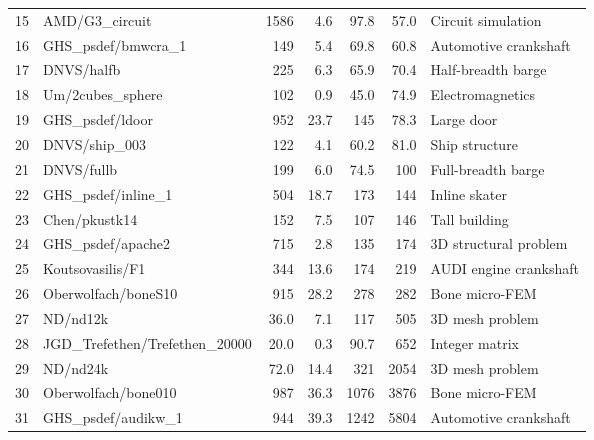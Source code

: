 \documentclass{article}
\begin{document}
\begin{table}[htbp]
\begin{center}
{\begin{tabular}{rl|rrrrl}
      15 & AMD/G3\_circuit                 & 1586     & 4.6      & 97.8     & 57.0     & Circuit simulation       \\
      16 & GHS\_psdef/bmwcra\_1            & 149      & 5.4      & 69.8     & 60.8     & Automotive crankshaft    \\
      17 & DNVS/halfb                      & 225      & 6.3      & 65.9     & 70.4     & Half-breadth barge       \\
      18 & Um/2cubes\_sphere               & 102      & 0.9      & 45.0     & 74.9     & Electromagnetics         \\
      19 & GHS\_psdef/ldoor                & 952      & 23.7     & 145      & 78.3     & Large door               \\
      20 & DNVS/ship\_003                  & 122      & 4.1      & 60.2     & 81.0     & Ship structure           \\
      21 & DNVS/fullb                      & 199      & 6.0      & 74.5     & 100      & Full-breadth barge       \\
      22 & GHS\_psdef/inline\_1            & 504      & 18.7     & 173      & 144      & Inline skater            \\
      23 & Chen/pkustk14                   & 152      & 7.5      & 107      & 146      & Tall building            \\
      24 & GHS\_psdef/apache2              & 715      & 2.8      & 135      & 174      & 3D structural problem    \\
      25 & Koutsovasilis/F1                & 344      & 13.6     & 174      & 219      & AUDI engine crankshaft   \\
      26 & Oberwolfach/boneS10             & 915      & 28.2     & 278      & 282      & Bone micro-FEM           \\
      27 & ND/nd12k                        & 36.0     & 7.1      & 117      & 505      & 3D mesh problem          \\
      28 & JGD\_Trefethen/Trefethen\_20000 & 20.0     & 0.3      & 90.7     & 652      & Integer matrix           \\
      29 & ND/nd24k                        & 72.0     & 14.4     & 321      & 2054     & 3D mesh problem          \\
      30 & Oberwolfach/bone010             & 987      & 36.3     & 1076     & 3876     & Bone micro-FEM           \\
      31 & GHS\_psdef/audikw\_1            & 944      & 39.3     & 1242     & 5804     & Automotive crankshaft    \\

\end{tabular}}
\end{center}
\end{table}
\end{document}
